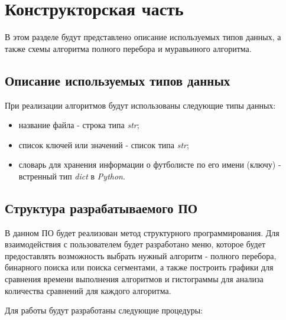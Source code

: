 \chapter{Конструкторская часть}
В этом разделе будут представлено описание используемых типов данных, а также схемы алгоритма полного перебора и муравьиного алгоритма.

\section{Описание используемых типов данных}

При реализации алгоритмов будут использованы следующие типы данных:

\begin{itemize}
	\item название файла - строка типа \textit{str};
	\item список ключей или значений - список типа \textit{str};
	\item словарь для хранения информации о футболисте по его имени (ключу) - встренный тип \textit{dict} в \textit{Python}.
\end{itemize}


\section{Структура разрабатываемого ПО}

В данном ПО будет реализован метод структурного программирования. Для взаимодействия с пользователем будет разработано меню, которое будет предоставлять возможность выбрать нужный алгоритм - полного перебора, бинарного поиска или поиска сегментами, а также построить графики для сравнения времени выполнения алгоритмов и гистограммы для анализа количества сравнений для каждого алгоритма. 

Для работы будут разработаны следующие процедуры:

